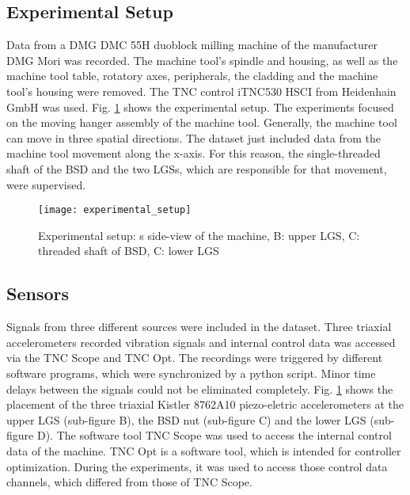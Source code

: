 \subsection{Experimental Setup}
Data from a DMG DMC 55H duoblock milling machine of the manufacturer DMG Mori was recorded. The machine tool’s spindle and housing, as well as the machine tool table, rotatory axes, peripherals, the cladding and the machine tool's housing were removed. The TNC control iTNC530 HSCI from Heidenhain GmbH was used. Fig. \ref{fig:experimental_setup} shows the experimental setup. The experiments focused on the moving hanger assembly of the machine tool. Generally, the machine tool can move in three spatial directions. The dataset just included data from the machine tool movement along the x-axis. For this reason, the single-threaded shaft of the BSD and the two LGSs, which are responsible for that movement, were supervised.

\begin{figure}[H]
  \centering
  \texttt{[image: experimental\_setup]}
  \caption {Experimental setup: s side-view of the machine, B: upper LGS, C: threaded shaft of BSD, C: lower LGS}
  \label{fig:experimental_setup}
\end{figure}

\subsection{Sensors}
Signals from three different sources were included in the dataset. Three triaxial accelerometers recorded vibration signals and internal control data was accessed via the TNC Scope and TNC Opt. The recordings were triggered by different software programs, which were synchronized by a python script. Minor time delays between the signals could not be eliminated completely. Fig. \ref{fig:experimental_setup} shows the placement of the three triaxial Kistler 8762A10 piezo-eletric accelerometers at the upper LGS (sub-figure B), the BSD nut (sub-figure C) and the lower LGS (sub-figure D). The software tool TNC Scope was used to access the internal control data of the machine. TNC Opt is a software tool, which is intended for controller optimization. During the experiments, it was used to access those control data channels, which differed from those of TNC Scope.

